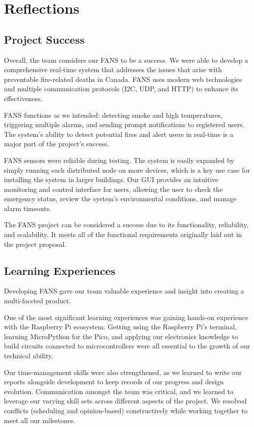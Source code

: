 \section{Reflections}

\subsection{Project Success}

Overall, the team considers our FANS to be a success. We were able to develop a comprehensive real-time system that
addresses the issues that arise with preventable fire-related deaths in Canada. FANS uses modern web technologies and
multiple communication protocols (I2C, UDP, and HTTP) to enhance its effectiveness.

FANS functions as we intended: detecting smoke and high temperatures, triggering multiple alarms, and sending prompt
notifications to registered users. The system's ability to detect potential fires and alert users in real-time is a
major part of the project’s success.

FANS sensors were reliable during testing. The system is easily expanded by simply running each distributed node on
more devices, which is a key use case for installing the system in larger buildings. Our GUI provides an intuitive
monitoring and control interface for users, allowing the user to check the emergency status, review the system's
environmental conditions, and manage alarm timeouts.

The FANS project can be considered a success due to its functionality, reliability, and scalability. It meets all of
the functional requirements originally laid out in the project proposal.

\subsection{Learning Experiences}

Developing FANS gave our team valuable experience and insight into creating a multi-faceted product.

One of the most significant learning experiences was gaining hands-on experience with the Raspberry Pi ecosystem.
Getting using the Raspberry Pi's terminal, learning MicroPython for the Pico, and applying our electronics knowledge to
build circuits connected to microcontrollers were all essential to the growth of our technical ability.

Our time-management skills were also strengthened, as we learned to write our reports alongside development to keep
records of our progress and design evolution. Communication amongst the team was critical, and we learned to leverage
our varying skill sets across different aspects of the project. We resolved conflicts (scheduling and opinion-based)
constructively while working together to meet all our milestones.

